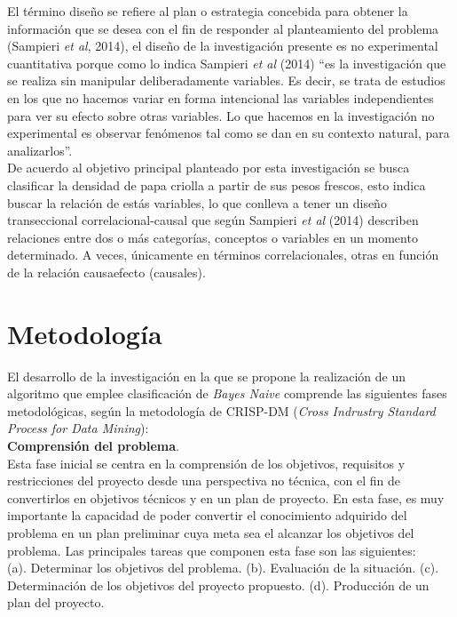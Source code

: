 El término diseño se refiere al plan o estrategia concebida para obtener la información que se desea con el fin de responder al
planteamiento del problema (Sampieri \textit{et al}, 2014), el diseño de la investigación presente es no experimental cuantitativa porque como lo indica Sampieri \textit{et al} (2014) “es la investigación que se realiza sin manipular deliberadamente variables. Es decir, se trata de estudios en los que no hacemos variar en forma intencional las variables independientes para ver su efecto sobre otras variables. Lo que hacemos en la investigación no experimental es observar fenómenos tal como se dan en su contexto natural, para analizarlos”.\\

De acuerdo al objetivo principal planteado por esta investigación se busca clasificar la densidad de papa criolla a partir de sus pesos frescos, esto indica buscar la relación de estás variables, lo que conlleva a tener un diseño transeccional correlacional-causal que según Sampieri \textit{et al} (2014) describen relaciones entre dos o más categorías, conceptos o variables en un momento determinado. A veces, únicamente en términos correlacionales, otras en función de la relación causaefecto (causales).
  

\section{Metodolog\'ia}

El desarrollo de la investigación en la que se propone la realización de un algoritmo que emplee clasificación de \textit{Bayes Naive} comprende las siguientes fases metodológicas, según la metodología de CRISP-DM (\emph{Cross Indrustry Standard Process for Data Mining}):\\

\noindent
\textbf{Comprensión del problema}.\\

	Esta fase inicial se centra en la comprensión de los objetivos, requisitos y restricciones del proyecto desde una perspectiva no técnica, con el fin de convertirlos en objetivos técnicos y en un plan de proyecto. En esta fase, es muy importante la capacidad de poder convertir el conocimiento adquirido del problema en un plan preliminar cuya meta sea el alcanzar los objetivos del problema. Las principales tareas que componen esta fase son las siguientes:\\

(a).	Determinar los objetivos del problema.
(b).	Evaluación de la situación.
(c).	Determinación de los objetivos del proyecto propuesto.
(d).	Producción de un plan del proyecto.\\


